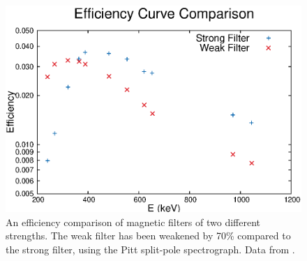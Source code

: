 \begin{figure}
    \centering
    \includegraphics[scale=1]{Setup_Figs/FilterComparison.eps}
    \caption{An efficiency comparison of magnetic filters of two different strengths. The weak filter has been weakened by 70\% compared to the strong filter, using the Pitt split-pole spectrograph. Data from \citep{metlay92:_iceball_comm}.}
    \label{fig:filtercomp}
\end{figure}